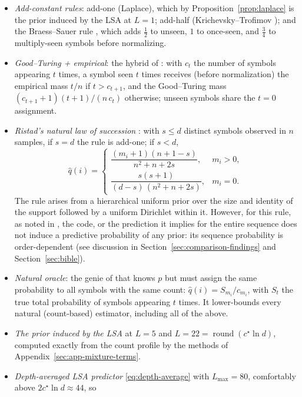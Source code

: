 \documentclass[11pt]{article}
\begin{document}
\begin{itemize}
\item \emph{Add-constant rules}: add-one (Laplace), which by
  Proposition~\ref{prop:laplace} is the prior induced by the LSA at \(L=1\);
  add-half (Krichevsky--Trofimov \cite{krichevsky1981performance}); and the
  Braess--Sauer rule \cite{braess2004bernstein}, which adds
  \(\tfrac12\) to unseen, \(1\) to once-seen, and \(\tfrac34\) to
  multiply-seen symbols before normalizing.
\item \emph{Good--Turing + empirical}: the hybrid of
  \cite{orlitsky2015competitive}: with \(c_t\) the number of symbols
  appearing \(t\) times, a symbol seen \(t\) times receives (before
  normalization) the empirical mass \(t/n\) if \(t>c_{t+1}\), and the
  Good--Turing mass \((c_{t+1}+1)(t+1)/(n\,c_t)\) otherwise;
  unseen symbols share the \(t=0\) assignment.
\item \emph{Ristad's natural law of succession} \cite{ristad1995natural}:
  with \(s\le d\) distinct symbols observed in \(n\) samples, if \(s=d\) the
  rule is add-one; if \(s<d\),
  \[
    \hat q(i)=
    \begin{cases}
      \dfrac{(m_i+1)(n+1-s)}{n^2+n+2s}, & m_i>0,\\[1.2ex]
      \dfrac{s(s+1)}{(d-s)\,(n^2+n+2s)}, & m_i=0 .
    \end{cases}
  \]
  The rule arises from a hierarchical uniform prior over the size and
  identity of the support followed by a uniform Dirichlet within it.
  However, for this rule, as noted in \cite{hutter2014}, the code, or the prediction it implies for the entire sequence does not induce a predictive probability of any prior: its sequence
probability is order-dependent (see discussion in Section~\ref{sec:comparison-findings} and Section~\ref{sec:bible}).
\item \emph{Natural oracle}: the genie of \cite{orlitsky2015competitive}
  that knows \(p\) but must assign the same probability to all symbols with
  the same count: \(\hat q(i)=S_{m_i}/c_{m_i}\), with \(S_t\) the true
  total probability of symbols appearing \(t\) times.  It lower-bounds every
  natural (count-based) estimator, including all of the above.
\item \emph{The prior induced by the LSA} at \(L=5\) and
  \(L=22=\operatorname{round}(c^\star\ln d)\), computed exactly from the
  count profile by the methods of Appendix~\ref{sec:app-mixture-terms}.
\item \emph{Depth-averaged LSA predictor}
  \eqref{eq:depth-average} with \(L_{\max}=80\), comfortably above \(2c^\star\ln d\approx 44\), so

\end{itemize}
\end{document}
